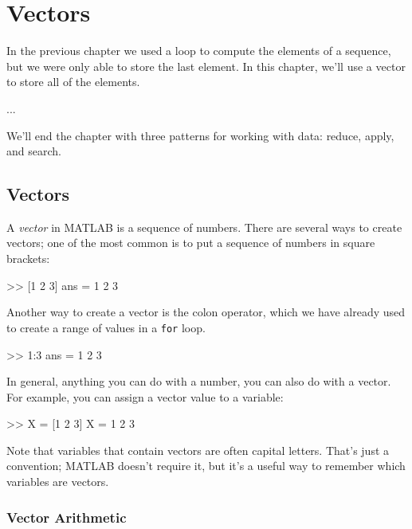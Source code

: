 \chapter{Vectors}
\label{vectors}
\minitoc{}

In the previous chapter we used a loop to compute the elements of a sequence, but we were only able to store the last element.  In this chapter, we'll use a vector to store all of the elements.

...

We'll end the chapter with three patterns for working with data: reduce, apply, and search.



\section{Vectors}


A \emph{vector} in MATLAB is a sequence of numbers.
There are several ways to create vectors; one of the most common is
to put a sequence of numbers in square brackets:

\begin{code}
>> [1 2 3]
ans = 1     2     3
\end{code}

Another way to create a vector is the colon operator, which we have already used to create a range of values in a {\tt for} loop.

\begin{code}
>> 1:3
ans = 1     2     3
\end{code}

In general, anything you can do with a number, you can also do with
a vector.  For example, you can assign a vector value to a variable:

\begin{code}
>> X = [1 2 3]
X = 1     2     3
\end{code}

Note that variables that contain vectors are often capital letters.
That's just a convention; MATLAB doesn't require it, but it's a useful way to remember which variables are vectors.


\subsection{Vector Arithmetic}


